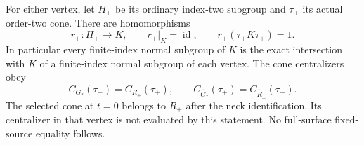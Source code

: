 For either vertex, let $H_\pm$ be its ordinary index-two subgroup
and $\tau_\pm$ its actual order-two cone. There are homomorphisms
\begin{equation}\label{eq:B108-paired-retractions}
 r_\pm:H_\pm\longrightarrow K,
 \qquad r_\pm|_K=\operatorname{id},\qquad
 r_\pm(\tau_\pm K\tau_\pm)=1.
\end{equation}
In particular every finite-index normal subgroup of $K$ is the
exact intersection with $K$ of a finite-index normal subgroup of
each vertex. The cone centralizers obey
\begin{equation}\label{eq:B108-centralizers}
 C_{G_*}(\tau_\pm)=C_{R_\pm}(\tau_\pm),\qquad
 C_{\widehat G_*}(\tau_\pm)
       =C_{\widehat R_\pm}(\tau_\pm).
\end{equation}
The selected cone at $t=0$ belongs to $R_+$ after the neck
identification. Its centralizer in that vertex is not evaluated
by this statement. No full-surface fixed-source equality follows.

